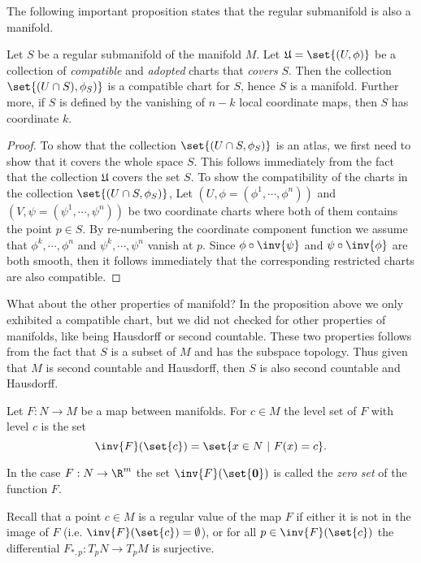 The following important proposition states that the regular submanifold is also a manifold.

\begin{proposition}
	\label{prop:regularSubmanifoldIsAManifold}
	Let $ S $ be a regular submanifold of the manifold $ M $. Let $ \mathfrak{U} = 
	\set{(U,\phi)} $ be a collection of \emph{compatible} and \emph{adopted} charts that \emph{covers} $ S $. Then the collection $ \set{(U\cap S), \phi_S)} $ is a compatible chart for $ S $, hence $ S $ is a manifold. Further more, if $ S $ is defined by the vanishing of $ n-k $ local coordinate maps, then $ S $ has coordinate $ k $.
\end{proposition}

\begin{proof}
	To show that the collection $ \set{(U\cap S,\phi_S)} $ is an atlas, we first need to show that it covers the whole space $ S $. This follows immediately from the fact that the collection $ \mathfrak{U} $ covers the set $ S $. To show the compatibility of the charts in the collection $ \set{(U\cap S, \phi_S)} $, Let $ (U,\phi = (\phi^1,\cdots,\phi^n)) $ and $ (V,\psi=(\psi^1,\cdots,\psi^n)) $ be two coordinate charts where both of them contains the point $ p \in S $. By re-numbering the coordinate component function we assume that $ \phi^k, \cdots, \phi^n $ and $ \psi^k,\cdots, \psi^n $ vanish at $ p $. Since $ \phi\circ\inv{\psi}  $ and $ \psi\circ\inv{\phi} $ are both smooth, then it follows immediately that the corresponding restricted charts are also compatible.
\end{proof}

\begin{carefull}
	What about the other properties of manifold? In the proposition above we only exhibited a compatible chart, but we did not checked for other properties of manifolds, like being Hausdorff or second countable. These two properties follows from the fact that $ S $ is a subset of $ M $ and has the subspace topology. Thus given that $ M $ is second countable and Hausdorff, then $ S $ is also second countable and Hausdorff.
\end{carefull}

\begin{definition}
	Let $ F: N \to M $ be a map between manifolds. For $ c \in M $ the level set of $ F $ with level $ c $ is the set 
	\[ \inv{F}(\set{c}) = \set{x \in N\ |\ F(x) = c}. \]
\end{definition}
\begin{remark}
	In the case $ F : N \to \R^m $ the set $ \inv{F}(\set{\mathbf{0}}) $ is called the \textit{zero set} of the function $ F $.
\end{remark}
\begin{remark}
	Recall that a point $ c \in M $ is a regular value of the map $ F $ if either it is not in the image of $ F $ (i.e. $ \inv{F}(\set{c}) = \emptyset $), or for all $ p \in \inv{F}(\set{c}) $ the differential $ F_{*,p} : T_p N \to T_pM $ is surjective. 
\end{remark}

